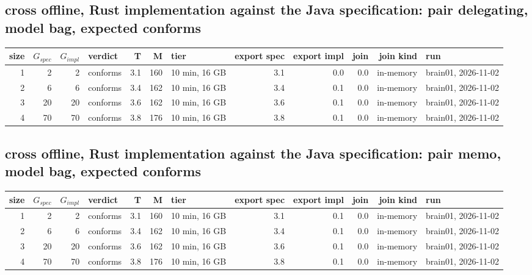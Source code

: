 \documentclass[10pt]{article}
\begin{document}
\subsection*{cross offline, Rust implementation against the Java specification: pair \textsf{delegating}, model bag, expected conforms}
\begin{longtable}{@{}rrrlrrlrrrrl@{}}
\toprule
size & $G_{\mathit{spec}}$ & $G_{\mathit{impl}}$ & verdict & T & M & tier & export spec & export impl & join & join kind & run \\
\midrule
\endhead
\color{red} 1 & 2 & 2 & conforms & 3.1 & 160 & 10 min, 16 GB & 3.1 & 0.0 & 0.0 & in-memory & brain01, 2026-11-02 \\
\color{red} 2 & 6 & 6 & conforms & 3.4 & 162 & 10 min, 16 GB & 3.4 & 0.1 & 0.0 & in-memory & brain01, 2026-11-02 \\
\color{red} 3 & 20 & 20 & conforms & 3.6 & 162 & 10 min, 16 GB & 3.6 & 0.1 & 0.0 & in-memory & brain01, 2026-11-02 \\
\color{red} 4 & 70 & 70 & conforms & 3.8 & 176 & 10 min, 16 GB & 3.8 & 0.1 & 0.0 & in-memory & brain01, 2026-11-02 \\
\bottomrule
\end{longtable}
\subsection*{cross offline, Rust implementation against the Java specification: pair \textsf{memo}, model bag, expected conforms}
\begin{longtable}{@{}rrrlrrlrrrrl@{}}
\toprule
size & $G_{\mathit{spec}}$ & $G_{\mathit{impl}}$ & verdict & T & M & tier & export spec & export impl & join & join kind & run \\
\midrule
\endhead
\color{red} 1 & 2 & 2 & conforms & 3.1 & 160 & 10 min, 16 GB & 3.1 & 0.1 & 0.0 & in-memory & brain01, 2026-11-02 \\
\color{red} 2 & 6 & 6 & conforms & 3.4 & 162 & 10 min, 16 GB & 3.4 & 0.1 & 0.0 & in-memory & brain01, 2026-11-02 \\
\color{red} 3 & 20 & 20 & conforms & 3.6 & 162 & 10 min, 16 GB & 3.6 & 0.1 & 0.0 & in-memory & brain01, 2026-11-02 \\
\color{red} 4 & 70 & 70 & conforms & 3.8 & 176 & 10 min, 16 GB & 3.8 & 0.1 & 0.0 & in-memory & brain01, 2026-11-02 \\
\bottomrule
\end{longtable}
\end{document}
